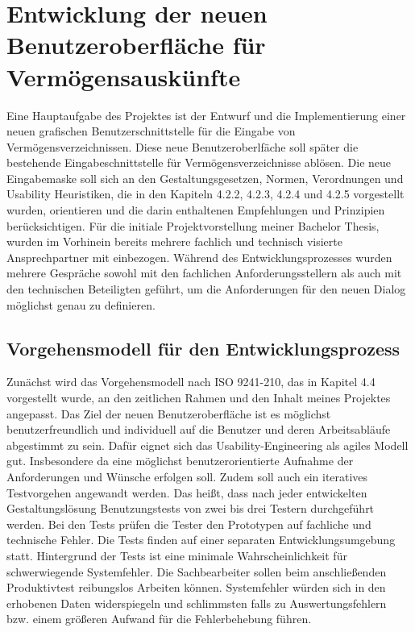 \section{Entwicklung der neuen Benutzeroberfläche für Vermögensauskünfte}
Eine Hauptaufgabe des Projektes ist der Entwurf und die Implementierung einer neuen grafischen Benutzerschnittstelle für die Eingabe von Vermögensverzeichnissen. Diese neue Benutzeroberlfäche soll später die bestehende Eingabeschnittstelle für Vermögensverzeichnisse ablösen. Die neue Eingabemaske soll sich an den Gestaltungsgesetzen, Normen, Verordnungen und Usability Heuristiken, die in den Kapiteln 4.2.2, 4.2.3, 4.2.4 und 4.2.5 vorgestellt wurden, orientieren und die darin enthaltenen Empfehlungen und Prinzipien berücksichtigen. Für die initiale Projektvorstellung meiner Bachelor Thesis, wurden im Vorhinein bereits mehrere fachlich und technisch visierte Ansprechpartner mit einbezogen. Während des Entwicklungsprozesses wurden mehrere Gespräche sowohl mit den fachlichen Anforderungsstellern als auch mit den technischen Beteiligten geführt, um die Anforderungen für den neuen Dialog möglichst genau zu definieren.

\subsection{Vorgehensmodell für den Entwicklungsprozess}

Zunächst wird das Vorgehensmodell nach ISO 9241-210, das in Kapitel 4.4 vorgestellt wurde, an den zeitlichen Rahmen und den Inhalt meines Projektes angepasst. Das Ziel der neuen Benutzeroberfläche ist es möglichst benutzerfreundlich und individuell auf die Benutzer und deren Arbeitsabläufe abgestimmt zu sein. Dafür eignet sich das Usability-Engineering als agiles Modell gut. Insbesondere da eine möglichst benutzerorientierte Aufnahme der Anforderungen und Wünsche erfolgen soll. Zudem soll auch ein iteratives Testvorgehen angewandt werden. Das heißt, dass nach jeder entwickelten Gestaltungslösung Benutzungstests von zwei bis drei Testern durchgeführt werden. Bei den Tests prüfen die Tester den Prototypen auf fachliche und technische Fehler. Die Tests finden auf einer separaten Entwicklungsumgebung statt. Hintergrund der Tests ist eine minimale Wahrscheinlichkeit für schwerwiegende Systemfehler. Die Sachbearbeiter sollen beim anschließenden Produktivtest reibungslos Arbeiten können. Systemfehler würden sich in den erhobenen Daten widerspiegeln und schlimmsten falls zu Auswertungsfehlern bzw. einem größeren Aufwand für die Fehlerbehebung führen.

